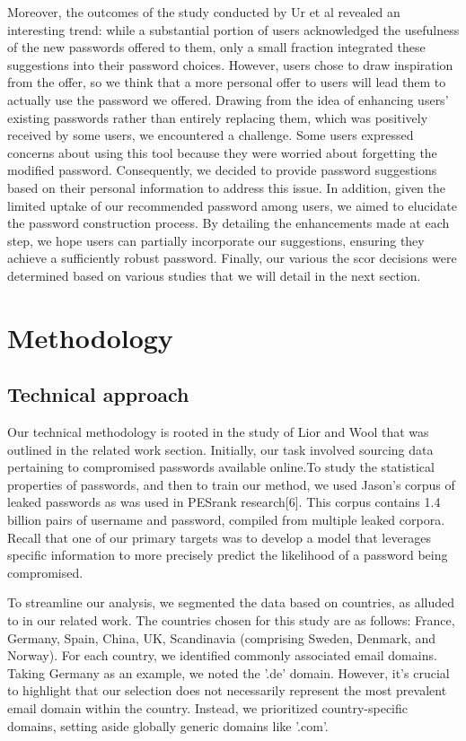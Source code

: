\documentclass[5p,twocolumn]{elsarticle}
\begin{document}
Moreover, the outcomes of the study conducted by Ur et al revealed an interesting trend: while a substantial portion of users acknowledged the usefulness of the new passwords offered to them, only a small fraction integrated these suggestions into their password choices. However, users chose to draw inspiration from the offer, so we think that a more personal offer to users will lead them to actually use the password we offered. Drawing from the idea of enhancing users' existing passwords rather than entirely replacing them, which was positively received by some users, we encountered a challenge. Some users expressed concerns about using this tool because they were worried about forgetting the modified password. Consequently, we decided to provide password suggestions based on their personal information to address this issue. In addition, given the limited uptake of our recommended password among users, we aimed to elucidate the password construction process. By detailing the enhancements made at each step, we hope users can partially incorporate our suggestions, ensuring they achieve a sufficiently robust password.
Finally, our various the scor decisions were determined based on various studies that we will detail in the next section.
\section{Methodology}
\label{Methodology}
\subsection{\textbf{Technical approach}}
Our technical methodology is rooted in the study of Lior and Wool that was outlined in the related work section.
Initially, our task involved sourcing data pertaining to compromised passwords available online.To study the statistical properties of passwords, and then to train our method, we used Jason’s corpus of leaked passwords as was used in PESrank research[6].	 This corpus contains 1.4 billion pairs of username and password, compiled from multiple leaked corpora.
Recall that one of our primary targets was to develop a model that leverages specific information to more precisely predict the likelihood of a password being compromised.

To streamline our analysis, we segmented the data based on countries, as alluded to in our related work. The countries chosen for this study are as follows: France, Germany, Spain, China, UK, Scandinavia (comprising Sweden, Denmark, and Norway). For each country, we identified commonly associated email domains. Taking Germany as an example, we noted the '.de' domain. However, it's crucial to highlight that our selection does not necessarily represent the most prevalent email domain within the country. Instead, we prioritized country-specific domains, setting aside globally generic domains like '.com'.
\end{document}
